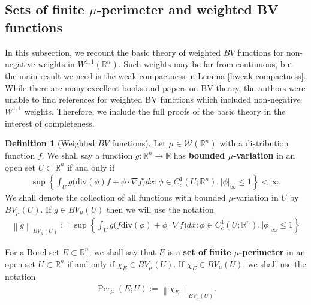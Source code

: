 \documentclass[12pt]{amsart}
\numberwithin{equation}{section}
\theoremstyle{plain}
\theoremstyle{definition}
\newtheorem{definition}[theorem]{Definition}
\newcommand{\norm}[1]{\left\lVert#1\right\rVert}
\begin{document}
\subsection{Sets of finite $\mu$-perimeter and weighted BV functions}\label{Sets of Finite mu-perimeter and weighted BV functions}

In this subsection, we recount the basic theory of weighted $BV$ functions for non-negative weights in $W^{1,1}(\mathbb{R}^n)$.  Such weights may be far from continuous, but the main result we need is the weak compactness in Lemma \ref{l:weak compactness}. While there are many excellent books and papers on BV theory, the authors were unable to find references for weighted BV functions which included non-negative $W^{1,1}$ weights.  Therefore, we include the full proofs of the basic theory in the interest of completeness.

\begin{definition}[Weighted $BV$ functions]\label{Weighted_BV}
Let $\mu \in \mathscr{W}(\mathbb{R}^n)$ with a distribution function $f$. We shall say a function $g: \mathbb{R}^n \rightarrow \mathbb{R}$ has {\bf bounded $\mu$-variation} in an open set $U \subset \mathbb{R}^n$ if and only if
\begin{align*}
    \sup \left\{\int_U g\Big(\text{div}(\phi)f +\phi \cdot \nabla f\Big)dx: \phi\in C^1_c(U; \mathbb{R}^n), |\phi|_{\infty} \le 1\right\}<\infty.\end{align*}
We shall denote the collection of all functions with bounded $\mu$-variation in $U$ by $BV_{\mu}(U)$. If $g \in BV_{\mu}(U)$ then we will use the notation
\begin{align*}
\norm{g}_{BV_\mu(U)} := \sup \left\{\int_{U}g\Big( f \text{div}(\phi) + \phi \cdot \nabla f\Big) dx: \phi \in C^1_c(U; \mathbb{R}^n), |\phi|_{\infty} \le 1\right\}
\end{align*}

For a Borel set $E \subset \mathbb{R}^n$, we shall say that $E$ is a {\bf set of finite $\mu$-perimeter} in an open set $U \subset \mathbb{R}^n$ if and only if $\chi_{E} \in BV_{\mu}(U)$. If $\chi_{E} \in BV_{\mu}(U)$, we shall use the notation
    \begin{align}\label{e:perimeter BV def}
       \operatorname{Per}_{\mu}(E; U):= \norm{\chi_{E}}_{BV_{\mu}(U)}.
    \end{align}
\end{definition}
\end{document}
